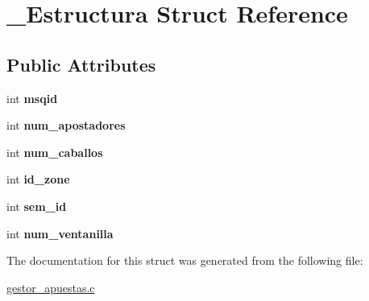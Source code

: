 \hypertarget{struct__Estructura}{}\section{\+\_\+\+Estructura Struct Reference}
\label{struct__Estructura}
\subsection*{Public Attributes}
\begin{DoxyCompactItemize}
\item 
int {\bfseries msqid}\hypertarget{struct__Estructura_a2ff7ac6a16d71c5959ad1ce89b6fc5e9}{}\label{struct__Estructura_a2ff7ac6a16d71c5959ad1ce89b6fc5e9}

\item 
int {\bfseries num\+\_\+apostadores}\hypertarget{struct__Estructura_a8943104835b5c1146554e4cda02243d4}{}\label{struct__Estructura_a8943104835b5c1146554e4cda02243d4}

\item 
int {\bfseries num\+\_\+caballos}\hypertarget{struct__Estructura_a2ee163615bc18f5babab7c179f2ede48}{}\label{struct__Estructura_a2ee163615bc18f5babab7c179f2ede48}

\item 
int {\bfseries id\+\_\+zone}\hypertarget{struct__Estructura_aac1f57fdfebc0d6e099060fbeb39e0cd}{}\label{struct__Estructura_aac1f57fdfebc0d6e099060fbeb39e0cd}

\item 
int {\bfseries sem\+\_\+id}\hypertarget{struct__Estructura_a33f1c056f0a554bad03732ad2081818b}{}\label{struct__Estructura_a33f1c056f0a554bad03732ad2081818b}

\item 
int {\bfseries num\+\_\+ventanilla}\hypertarget{struct__Estructura_a5cc908af3deb41af89931e6127e1678d}{}\label{struct__Estructura_a5cc908af3deb41af89931e6127e1678d}

\end{DoxyCompactItemize}


The documentation for this struct was generated from the following file\+:\begin{DoxyCompactItemize}
\item 
\hyperlink{gestor__apuestas_8c}{gestor\+\_\+apuestas.\+c}\end{DoxyCompactItemize}
